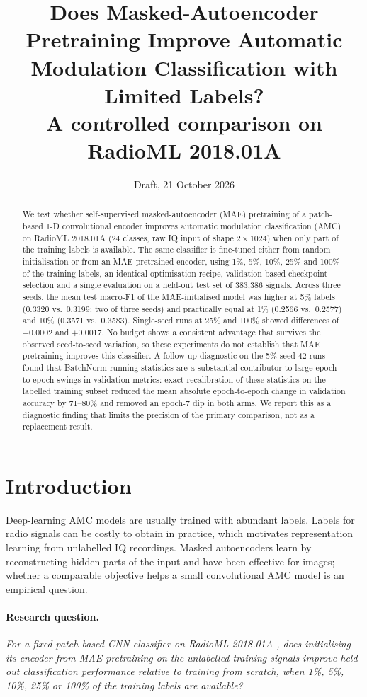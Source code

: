 \documentclass[11pt,a4paper]{article}
\title{Does Masked-Autoencoder Pretraining Improve Automatic Modulation Classification with Limited Labels?\\[0.3em]
\large A controlled comparison on RadioML 2018.01A}
\author{\reviewnote{author name, affiliation, course/module}}
\date{Draft, 21 October 2026}
\begin{document}
\maketitle

\begin{abstract}
We test whether self-supervised masked-autoencoder (MAE) pretraining of a patch-based 1-D convolutional encoder improves automatic modulation classification (AMC) on RadioML 2018.01A (24 classes, raw IQ input of shape $2\times1024$) when only part of the training labels is available.
The same classifier is fine-tuned either from random initialisation or from an MAE-pretrained encoder, using 1\%, 5\%, 10\%, 25\% and 100\% of the training labels, an identical optimisation recipe, validation-based checkpoint selection and a single evaluation on a held-out test set of 383,386 signals.
Across three seeds, the mean test macro-F1 of the MAE-initialised model was higher at 5\% labels (0.3320 vs.\ 0.3199; two of three seeds) and practically equal at 1\% (0.2566 vs.\ 0.2577) and 10\% (0.3571 vs.\ 0.3583).
Single-seed runs at 25\% and 100\% showed differences of $-0.0002$ and $+0.0017$.
No budget shows a consistent advantage that survives the observed seed-to-seed variation, so these experiments do not establish that MAE pretraining improves this classifier.
A follow-up diagnostic on the 5\% seed-42 runs found that BatchNorm running statistics are a substantial contributor to large epoch-to-epoch swings in validation metrics: exact recalibration of these statistics on the labelled training subset reduced the mean absolute epoch-to-epoch change in validation accuracy by 71--80\% and removed an epoch-7 dip in both arms.
We report this as a diagnostic finding that limits the precision of the primary comparison, not as a replacement result.
\end{abstract}

\section{Introduction}
Deep-learning AMC models are usually trained with abundant labels. Labels for radio signals can be costly to obtain in practice, which motivates representation learning from unlabelled IQ recordings. Masked autoencoders \citep{he2022mae} learn by reconstructing hidden parts of the input and have been effective for images; whether a comparable objective helps a small convolutional AMC model is an empirical question.

\paragraph{Research question.} \emph{For a fixed patch-based CNN classifier on RadioML 2018.01A \citep{oshea2018overtheair}, does initialising its encoder from MAE pretraining on the unlabelled training signals improve held-out classification performance relative to training from scratch, when 1\%, 5\%, 10\%, 25\% or 100\% of the training labels are available?}
\end{document}
